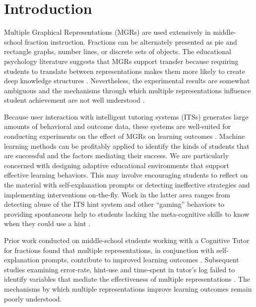 \documentclass{edm_template}
\begin{document}

\section{Introduction}
\label{sec:introduction}

Multiple Graphical Representations (MGRs) are used extensively in middle-school fraction instruction.  Fractions can be alternately presented as pie and rectangle graphs, number lines, or discrete sets of objects. The educational psychology literature suggests that MGRs support transfer because requiring students to translate between representations makes them more likely to create deep knowledge structures \cite{Ambrose2010}. Nevertheless, the experimental results are somewhat ambiguous \cite{Ainsworth1999} and the mechanisms through which multiple representations influence student achievement are not well understood \cite{Ainsworth2006}. 

Because user interaction with intelligent tutoring systems (ITSs) generates large amounts of behavioral and outcome data, these systems are well-suited for conducting experiments on the effect of MGRs on learning outcomes \cite{Newell1981}. Machine learning methods can be profitably applied to identify the kinds of students that are successful and the factors mediating their success. We are particularly concerned with designing adaptive educational environments that support effective learning behaviors. This may involve encouraging students to reflect on the material with self-explanation prompts \cite{Rau2009} or detecting ineffective strategies and implementing interventions on-the-fly. Work in the latter area ranges from detecting abuse of the ITS hint system and other ``gaming'' behaviors \cite{Baker2009,Baker2009b} to providing spontaneous help to students lacking the meta-cognitive skills to know when they could use a hint \cite{Aleven2000,Aleven2003,Aleven2006}.

Prior work conducted on middle-school students working with a Cognitive Tutor for fractions found that multiple representations, in conjunction with self-explanation prompts, contribute to improved learning outcomes \cite{Rau2009}. Subsequent studies examining error-rate, hint-use and time-spent in tutor's log failed to identify variables that mediate the effectiveness of multiple representations \cite{Rau2012}. The mechanisms by which multiple representations improve learning outcomes remain poorly understood.
\end{document}
